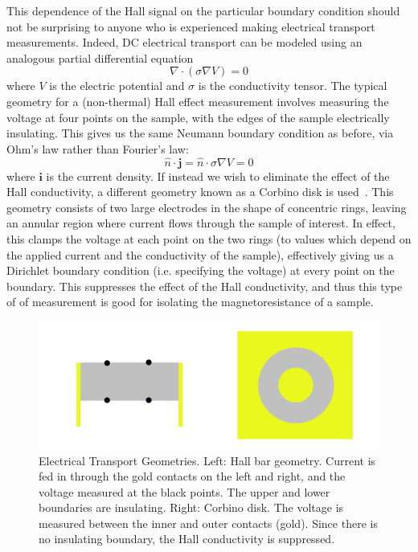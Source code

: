 \documentclass{thesis-umich}
\begin{document}
This dependence of the Hall signal on the particular boundary condition should
not be surprising to anyone who is experienced making electrical transport
measurements. Indeed, DC electrical transport can be modeled using an analogous
partial differential equation \[ \nabla \cdot (\sigma \nabla V) = 0 \] where
$V$ is the electric potential and $\sigma$ is the conductivity tensor. The
typical geometry for a (non-thermal) Hall effect measurement involves measuring
the voltage at four points on the sample, with the edges of the sample
electrically insulating. This gives us the same Neumann boundary condition as
before, via Ohm's law rather than Fourier's law: \[ \hat{n} \cdot \mathbf{j} =
\hat{n} \cdot \sigma \nabla V = 0\] where $\mathbf{i}$ is the current density.
If instead we wish to eliminate the effect of the Hall conductivity, a
different geometry known as a Corbino disk is used~\cite{Eo2018}. This geometry consists of
two large electrodes in the shape of concentric rings, leaving an annular
region where current flows through the sample of interest. In effect, this
clamps the voltage at each point on the two rings (to values which depend on
the applied current and the conductivity of the sample), effectively giving us
a Dirichlet boundary condition (i.e. specifying the voltage) at every point on the boundary. This suppresses
the effect of the Hall conductivity, and thus this type of of measurement is
good for isolating the magnetoresistance of a sample.

\begin{figure} \centering
	\includegraphics[width=\textwidth]{figures/ehall_geometry.pdf}
	\caption[Electrical Transport Geometries]{Electrical Transport
	Geometries. Left: Hall bar geometry. Current is fed in through the gold
contacts on the left and right, and the voltage measured at the black points.
The upper and lower boundaries are insulating. Right: Corbino disk. The voltage
is measured between the inner and outer contacts (gold). Since there is no
insulating boundary, the Hall conductivity is suppressed.} \end{figure}
\end{document}
